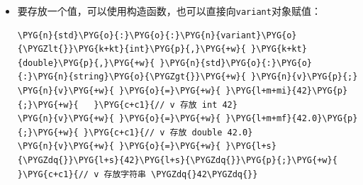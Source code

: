\begin{itemize}
\begin{codeblockbg}
\begin{Verbatim}[commandchars=\\\{\},breaklines=true,breakanywhere=true,fontsize=\codefont,xleftmargin=17bp]
\PYG{n}{std}\PYG{o}{:}\PYG{o}{:}\PYG{n}{variant}\PYG{o}{\PYGZlt{}}\PYG{k+kt}{int}\PYG{p}{,}\PYG{+w}{ }\PYG{k+kt}{double}\PYG{p}{,}\PYG{+w}{ }\PYG{n}{std}\PYG{o}{:}\PYG{o}{:}\PYG{n}{string}\PYG{o}{\PYGZgt{}}\PYG{+w}{ }\PYG{n}{v}\PYG{+w}{ }\PYG{o}{=}\PYG{+w}{ }\PYG{l+m+mi}{42}\PYG{p}{;}
\PYG{k}{auto}\PYG{+w}{ }\PYG{n}{i1}\PYG{+w}{ }\PYG{o}{=}\PYG{+w}{ }\PYG{n}{std}\PYG{o}{:}\PYG{o}{:}\PYG{n}{get}\PYG{o}{\PYGZlt{}}\PYG{k+kt}{int}\PYG{o}{\PYGZgt{}}\PYG{p}{(}\PYG{n}{v}\PYG{p}{)}\PYG{p}{;}
\PYG{k}{auto}\PYG{+w}{ }\PYG{n}{i2}\PYG{+w}{ }\PYG{o}{=}\PYG{+w}{ }\PYG{n}{std}\PYG{o}{:}\PYG{o}{:}\PYG{n}{get}\PYG{o}{\PYGZlt{}}\PYG{l+m+mi}{0}\PYG{o}{\PYGZgt{}}\PYG{p}{(}\PYG{n}{v}\PYG{p}{)}\PYG{p}{;}
\PYG{k}{try}
\PYG{p}{\PYGZob{}}
\PYG{+w}{  }\PYG{k}{auto}\PYG{+w}{ }\PYG{n}{f}\PYG{+w}{ }\PYG{o}{=}\PYG{+w}{ }\PYG{n}{std}\PYG{o}{:}\PYG{o}{:}\PYG{n}{get}\PYG{o}{\PYGZlt{}}\PYG{k+kt}{double}\PYG{o}{\PYGZgt{}}\PYG{p}{(}\PYG{n}{v}\PYG{p}{)}\PYG{p}{;}
\PYG{p}{\PYGZcb{}}
\PYG{k}{catch}\PYG{+w}{ }\PYG{p}{(}\PYG{n}{std}\PYG{o}{:}\PYG{o}{:}\PYG{n}{bad\PYGZus{}variant\PYGZus{}access}\PYG{+w}{ }\PYG{k}{const}\PYG{+w}{ }\PYG{o}{\PYGZam{}}\PYG{+w}{ }\PYG{n}{e}\PYG{p}{)}
\PYG{p}{\PYGZob{}}
\PYG{+w}{  }\PYG{n}{std}\PYG{o}{:}\PYG{o}{:}\PYG{n}{cout}\PYG{+w}{ }\PYG{o}{\PYGZlt{}}\PYG{o}{\PYGZlt{}}\PYG{+w}{ }\PYG{n}{e}\PYG{p}{.}\PYG{n}{what}\PYG{p}{(}\PYG{p}{)}\PYG{+w}{ }\PYG{o}{\PYGZlt{}}\PYG{o}{\PYGZlt{}}\PYG{+w}{ }\PYG{n}{std}\PYG{o}{:}\PYG{o}{:}\PYG{n}{endl}\PYG{p}{;}\PYG{+w}{ }\PYG{c+c1}{// 意外的索引}
\PYG{p}{\PYGZcb{}}
\end{Verbatim}
\end{codeblockbg}



\item 要存放一个值，可以使用构造函数，也可以直接向\texttt{variant}对象赋值：



\begin{codeblockbg}
\begin{Verbatim}[commandchars=\\\{\},breaklines=true,breakanywhere=true,fontsize=\codefont,xleftmargin=17bp]
\PYG{n}{std}\PYG{o}{:}\PYG{o}{:}\PYG{n}{variant}\PYG{o}{\PYGZlt{}}\PYG{k+kt}{int}\PYG{p}{,}\PYG{+w}{ }\PYG{k+kt}{double}\PYG{p}{,}\PYG{+w}{ }\PYG{n}{std}\PYG{o}{:}\PYG{o}{:}\PYG{n}{string}\PYG{o}{\PYGZgt{}}\PYG{+w}{ }\PYG{n}{v}\PYG{p}{;}
\PYG{n}{v}\PYG{+w}{ }\PYG{o}{=}\PYG{+w}{ }\PYG{l+m+mi}{42}\PYG{p}{;}\PYG{+w}{   }\PYG{c+c1}{// v 存放 int 42}
\PYG{n}{v}\PYG{+w}{ }\PYG{o}{=}\PYG{+w}{ }\PYG{l+m+mf}{42.0}\PYG{p}{;}\PYG{+w}{ }\PYG{c+c1}{// v 存放 double 42.0}
\PYG{n}{v}\PYG{+w}{ }\PYG{o}{=}\PYG{+w}{ }\PYG{l+s}{\PYGZdq{}}\PYG{l+s}{42}\PYG{l+s}{\PYGZdq{}}\PYG{p}{;}\PYG{+w}{ }\PYG{c+c1}{// v 存放字符串 \PYGZdq{}42\PYGZdq{}}
\end{Verbatim}
\end{codeblockbg}



\end{itemize}
